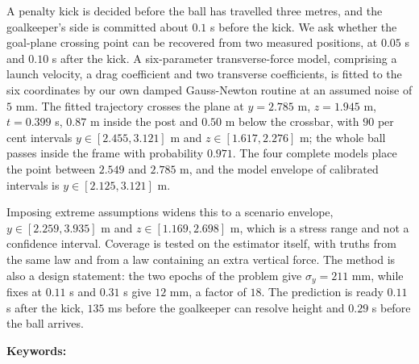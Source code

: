 \begin{titlepage}
{\setlength{\leftskip}{0.05\textwidth}%
 \setlength{\rightskip}{0.05\textwidth}%
 \setlength{\parindent}{0pt}%
A penalty kick is decided before the ball has travelled three metres, and the
goalkeeper's side is committed about $0.1$ s before the kick. We ask whether the
goal-plane crossing point can be recovered from two measured positions, at
$0.05$ s and $0.10$ s after the kick. A six-parameter transverse-force model,
comprising a launch velocity, a drag coefficient and two transverse
coefficients, is fitted to the six coordinates by our own damped Gauss-Newton
routine at an assumed noise of $5$ mm. The fitted trajectory crosses the plane
at $y=2.785$ m, $z=1.945$ m, $t=0.399$ s, $0.87$ m inside the post and $0.50$ m
below the crossbar, with $90$ per cent intervals $y\in[2.455,3.121]$ m and
$z\in[1.617,2.276]$ m; the whole ball passes inside the frame with probability
$0.971$. The four complete models place the point between $2.549$ and
$2.785$ m, and the model envelope of calibrated intervals is
$y\in[2.125,3.121]$ m.

Imposing extreme assumptions widens this to a scenario envelope,
$y\in[2.259,3.935]$ m and $z\in[1.169,2.698]$ m, which is a stress range and not
a confidence interval. Coverage is tested on the estimator itself, with truths
from the same law and from a law containing an extra vertical force. The method
is also a design statement: the two epochs of the problem give
$\sigma_y=211$ mm, while fixes at $0.11$ s and $0.31$ s give $12$ mm, a factor of
$18$. The prediction is ready $0.11$ s after the kick, $135$ ms before the
goalkeeper can resolve height and $0.29$ s before the ball arrives.\par}

\ifkeywords
  \vspace{1.0em}
  \begingroup
  \setlength{\leftskip}{0.05\textwidth}%
  \setlength{\rightskip}{0.05\textwidth}%
  \setlength{\parindent}{0pt}%
  \noindent\textbf{Keywords:}~\keywords\par
  \endgroup
\fi

\vfill
\end{titlepage}
\setcounter{page}{2}%

